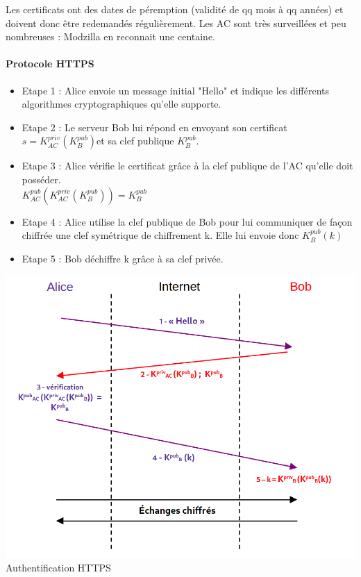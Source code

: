 \begin{com}
	Les certificats ont des dates de péremption (validité de qq mois à qq années) et doivent donc être redemandés régulièrement. Les AC sont très surveillées et peu nombreuses : Modzilla en reconnait une centaine.
\end{com}

\paragraph{Protocole HTTPS\\}
\begin{itemize}
	\item Etape 1 : Alice envoie un message initial "Hello" et indique les différents algorithmes cryptographiques qu'elle supporte. 
	\item Etape 2 : Le serveur Bob lui répond en envoyant son certificat $s = K_{AC}^{priv}(K_{B}^{pub}) $et sa clef publique $ K_{B}^{pub}$.
	\item Etape 3 : Alice vérifie le certificat grâce à la clef publique de l'AC qu'elle doit posséder. 
	\\ $K_{AC}^{pub}(K_{AC}^{priv}(K_{B}^{pub})) = K_{B}^{pub}$
	\item Etape 4 : Alice utilise la clef publique de Bob pour lui communiquer de façon chiffrée une clef symétrique de chiffrement k. Elle lui envoie donc $K_{B}^{pub}(k)$
	\item Etape 5 : Bob déchiffre k grâce à sa clef privée.
\end{itemize}


\begin{center}
	\includegraphics[scale=0.5]{Developpements/Protocole HTTPS/https.png}
	{Authentification HTTPS}
\end{center}

